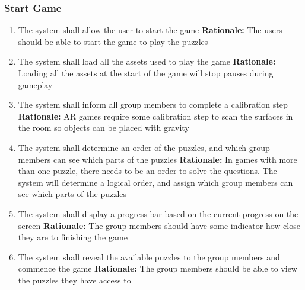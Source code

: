 \documentclass[12pt]{article}
\begin{document}
\subsubsection{Start Game}
\begin{enumerate}[label=ST\arabic*., series=StartGame]
	\item The system shall allow the user to start the game\newline 
    \textbf{Rationale:} The users should be able to start the game to play the puzzles
    \item The system shall load all the assets used to play the game\newline 
    \textbf{Rationale:} Loading all the assets at the start of the game will stop pauses during gameplay
    \item The system shall inform all group members to complete a calibration step\newline 
    \textbf{Rationale:} AR games require some calibration step to scan the surfaces in the room so objects can be placed with gravity
    \item The system shall determine an order of the puzzles, and which group members can see which parts of the puzzles\newline 
    \textbf{Rationale:} In games with more than one puzzle, there needs to be an order to solve the questions. The system will determine a logical order, and assign which group members can see which parts of the puzzles
    \item The system shall display a progress bar based on the current progress on the screen\newline 
    \textbf{Rationale:} The group members should have some indicator how close they are to finishing the game
    \item The system shall reveal the available puzzles to the group members and commence the game\newline 
    \textbf{Rationale:} The group members should be able to view the puzzles they have access to
\end{enumerate}
\end{document}
